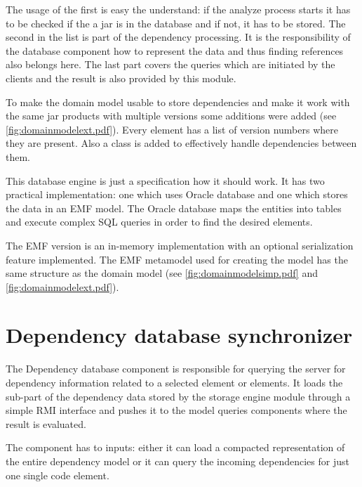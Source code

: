 The usage of the first is easy the understand: if the analyze process starts it
has to be checked if the a jar is in the database and if not, it has to be
stored. The second in the list is part of the dependency processing. It is the
responsibility of the database component how to represent the data and thus
finding references also belongs here. The last part covers the queries which are
initiated by the clients and the result is also provided by this module.

To make the domain model usable to store dependencies and make it work with the
same jar products with multiple versions some additions were added (see
\autoref{fig:domainmodelext.pdf}).  Every element has a list of version numbers where they are
present. Also a  class is added to effectively handle
dependencies between them.

This database engine is just a specification how it should work. It has two
practical implementation: one which uses Oracle database and one which stores
the data in an EMF model. The Oracle database maps the entities into tables and
execute complex SQL queries in order to find the desired elements.

The EMF version is an in-memory implementation with an optional serialization
feature implemented. The EMF metamodel used for creating the model has the same
structure as the domain model (see \autoref{fig:domainmodelsimp.pdf} and
\autoref{fig:domainmodelext.pdf}).



\section{Dependency database synchronizer}
The Dependency database component is responsible for querying the server for
dependency information related to a selected element or elements. It loads the
sub-part of the dependency data stored by the storage engine module through a
simple RMI interface and pushes it to the model queries components where the
result is evaluated.

The component has to inputs: either it can load a compacted representation of the 
entire dependency model or it can query the incoming dependencies for just one 
single code element. 

